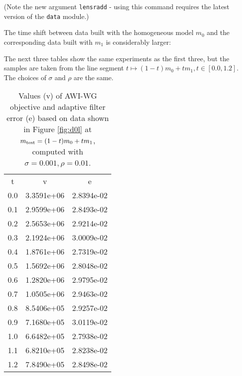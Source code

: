 (Note the new argument {\tt lensradd} - using this command requires the latest version of the {\tt data} module.)

The time shift between data built with the homogeneous model $m_0$ and the corresponding data built with $m_1$ is considerably larger:


The next three tables show the same experiments as the first three, but the samples are taken from the line segment $t \mapsto (1-t)m_0 + t m_1, t \in [0.0,1.2]$. The choices of $\sigma$ and $\rho$ are the same. 

\begin{table}
  \begin{center}
  \begin{tabular}{c|c|c}
    \hline
    t & v & e \\
0.0 & 3.3591e+06 & 2.8394e-02 \\
0.1 & 2.9599e+06 & 2.8493e-02 \\
0.2 & 2.5653e+06 & 2.9214e-02 \\
0.3 & 2.1924e+06 & 3.0009e-02 \\
0.4 & 1.8761e+06 & 2.7319e-02 \\
0.5 & 1.5692e+06 & 2.8048e-02 \\
0.6 & 1.2820e+06 & 2.9795e-02 \\
0.7 & 1.0505e+06 & 2.9463e-02 \\
0.8 & 8.5406e+05 & 2.9257e-02 \\
0.9 & 7.1680e+05 & 3.0119e-02 \\
1.0 & 6.6482e+05 & 2.7938e-02 \\
1.1 & 6.8210e+05 & 2.8238e-02 \\
1.2 & 7.8490e+05 & 2.8498e-02 \\
        \hline 
  \end{tabular}
   \caption{Values (v) of AWI-WG objective and adaptive filter error (e) based on data shown in Figure \ref{fig:d0l} at $m_{\rm test} = (1-t)m_0 + t m_1$, computed with $\sigma=0.001, \rho = 0.01$.}
    \label{table:m1rho01}
  \end{center}
\end{table}
